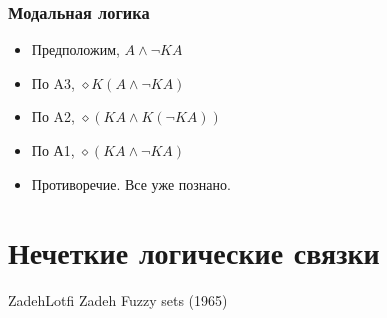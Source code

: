 \documentclass[24pt,pdf,hyperref={unicode},aspectratio=169]{beamer}
\begin{document}
\begin{frame}\frametitle{Модальная логика}



\begin{itemize}
\item<+-> Предположим, $A\wedge\neg KA$ 
\item<+-> По A3, $\diamond K (A\wedge\neg KA)$ 
\item<+-> По A2, $\diamond ( KA \wedge K(\neg KA) )$ 
\item<+-> По А1, $\diamond ( KA \wedge \neg KA) $
\item<+-> Противоречие. Все уже познано.
\end{itemize}
\end{frame}

\section{Нечеткие логические связки}

\begin{frame}
 \bio
 {Zadeh}{Lotfi Zadeh}
 {Fuzzy sets (1965)}
\end{frame}
\end{document}
